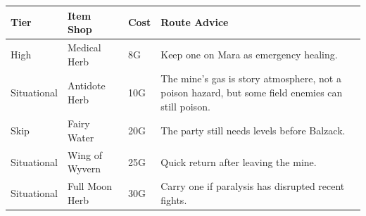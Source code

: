 \documentclass[
  american,
  10pt,
  letterpaper,
  oneside,
  open=any]{scrreprt}
\newcounter{none} %
\newenvironment{guidetable}{%
  \small\setstretch{1.0}%
  \setlength{\tabcolsep}{4pt}%
  \setlength{\LTpre}{8pt}\setlength{\LTpost}{10pt}%
  \renewcommand{\arraystretch}{1.16}%
}{ }
\begin{document}
\begin{guidetable}

{\def\LTcaptype{none} %
\begin{longtable}[]{@{}
  >{\raggedright\arraybackslash}p{}
  >{\raggedright\arraybackslash}p{}
  >{\raggedleft\arraybackslash}p{}
  >{\raggedright\arraybackslash}p{}@{}}
\toprule\noalign{}
\begin{minipage}[b]{\linewidth}\raggedright
\color{GuideGreen}\bfseries Tier
\end{minipage} & \begin{minipage}[b]{\linewidth}\raggedright
\color{GuideGreen}\bfseries Item Shop
\end{minipage} & \begin{minipage}[b]{\linewidth}\raggedleft
\color{GuideGreen}\bfseries Cost
\end{minipage} & \begin{minipage}[b]{\linewidth}\raggedright
\color{GuideGreen}\bfseries Route Advice
\end{minipage} \\
\midrule\noalign{}
\endhead
\bottomrule\noalign{}
\endlastfoot
High & Medical Herb & 8G & Keep one on Mara as emergency healing. \\
Situational & Antidote Herb & 10G & The mine's gas is story atmosphere,
not a poison hazard, but some field enemies can still poison. \\
Skip & Fairy Water & 20G & The party still needs levels before
Balzack. \\
Situational & Wing of Wyvern & 25G & Quick return after leaving the
mine. \\
Situational & Full Moon Herb & 30G & Carry one if paralysis has
disrupted recent fights. \\
\end{longtable}
}

\end{guidetable}
\end{document}
